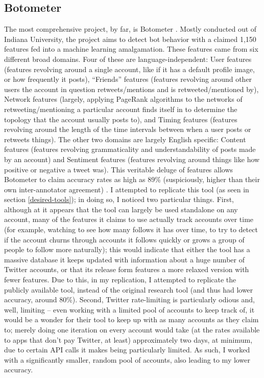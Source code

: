 \documentclass[11pt]{article}
\begin{document}
\subsection{Botometer}
The most comprehensive project, by far, is Botometer \cite{botometer-main}. Mostly conducted out of Indiana University, the project aims to detect bot behavior with a claimed 1,150 features fed into a machine learning amalgamation. These features came from six different broad domains. Four of these are language-independent: User features (features revolving around a single account, like if it has a default profile image, or how frequently it posts), ``Friends'' features (features revolving around other users the account in question retweets/mentions and is retweeted/mentioned by), Network features (largely, applying PageRank algorithms to the networks of retweeting/mentioning a particular account finds itself in to determine the topology that the account usually posts to), and Timing features (features revolving around the length of the time intervals between when a user posts or retweets things). The other two domains are largely English specific: Content features (features revolving grammaticality and understandability of posts made by an account) and Sentiment features (features revolving around things like how positive or negative a tweet was). This veritable deluge of features allows Botometer to claim accuracy rates as high as 89\% (suspiciously, higher than their own inter-annotator agreement) \cite{botometer-paper}. I attempted to replicate this tool (as seen in section \ref{desired-tools}); in doing so, I noticed two particular things. First, although at \cite{botometer-main} it appears that the tool can largely be used standalone on any account, many of the features it claims to use actually track accounts over time (for example, watching to see how many follows it has over time, to try to detect if the account churns through accounts it follows quickly or grows a group of people to follow more naturally); this would indicate that either the tool has a massive database it keeps updated with information about a huge number of Twitter accounts, or that its release form features a more relaxed version with fewer features. Due to this, in my replication, I attempted to replicate the publicly available tool, instead of the original research tool (and thus had lower accuracy, around 80\%). Second, Twitter rate-limiting is particularly odious and, well, limiting -- even working with a limited pool of accounts to keep track of, it would be a wonder for their tool to keep up with as many accounts as they claim to; merely doing one iteration on every account would take (at the rates available to apps that don't pay Twitter, at least) approximately two days, at minimum, due to certain API calls it makes being particularly limited. As such, I worked with a significantly smaller, random pool of accounts, also leading to my lower accuracy.
\end{document}
